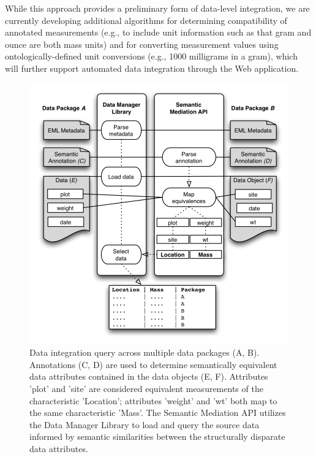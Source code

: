 While this approach provides a preliminary form of data-level
integration, we are currently developing additional algorithms for
determining compatibility of annotated measurements (e.g., to include
unit information such as that gram and ounce are both mass units) and
for converting measurement values using ontologically-defined unit
conversions (e.g., 1000 milligrams in a gram), which will further
support automated data integration through the Web application.


\begin{figure}
\centering
\includegraphics[scale=1.0]{images/integration.png}
\caption{Data integration query across multiple data packages (A, B).
  Annotations (C, D) are used to determine semantically equivalent
  data attributes contained in the data objects (E, F). Attributes
  'plot' and 'site' are considered equivalent measurements of the
  characteristic 'Location'; attributes 'weight' and 'wt' both map to
  the same characteristic 'Mass'. The Semantic Mediation API utilizes
  the Data Manager Library to load and query the source data informed
  by semantic similarities between the structurally disparate data
  attributes.}
\label{fig:integration}
\end{figure}

